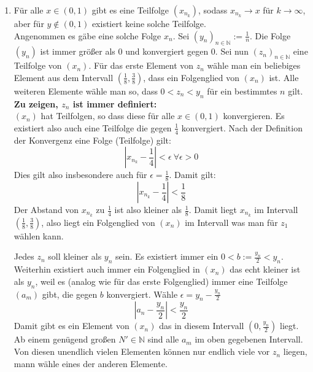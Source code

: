 \documentclass{article}
\begin{document}
\begin{enumerate}[ label = (\roman*)]
            \item Für alle \( x \in (0, 1) \) gibt es eine Teilfolge \( (x_{n_k}) \), sodass \(x_{n_k} \to x\) für \( k \to \infty \), aber für \(y \notin (0, 1)\) existiert keine solche Teilfolge. \\
            Angenommen es gäbe eine solche Folge \(x_n\).
            Sei \( {(y_n)}_{n \in \mathbb{N}} := \frac{1}{n} \). Die Folge \( (y_n) \) ist immer größer als 0 und konvergiert gegen 0.
            Sei nun \( {(z_n)}_{n \in \mathbb{N}} \) eine Teilfolge von \((x_n)\).
            Für das erste Element von \(z_n\) wähle man ein beliebiges Element aus dem Intervall \( (\frac{1}{8}, \frac{3}{8}) \), dass ein Folgenglied von \((x_n)\) ist. 
            Alle weiteren Elemente wähle man so, dass \(0 < z_n < y_n\) für ein bestimmtes \(n\) gilt. \\
            \textbf{Zu zeigen, \(z_n\) ist immer definiert:} \\
            \((x_n)\) hat Teilfolgen, so dass diese für alle \(x \in (0, 1)\) konvergieren. Es existiert also auch eine Teilfolge die gegen \(\frac{1}{4}\) konvergiert.
            Nach der Definition der Konvergenz eine Folge (Teilfolge) gilt:
            \[ | x_{n_k} - \frac{1}{4} | < \epsilon \ \forall \epsilon > 0 \]
            Dies gilt also insbesondere auch für \(\epsilon = \frac{1}{8}\). Damit gilt:
            \[ | x_{n_k} - \frac{1}{4} | < \frac{1}{8} \]
            Der Abstand von \(x_{n_k}\) zu \(\frac{1}{4}\) ist also kleiner als \(\frac{1}{8}\). Damit liegt \(x_{n_k}\) im Intervall \( (\frac{1}{8}, \frac{3}{8}) \),
            also liegt ein Folgenglied von \((x_n)\) im Intervall was man für \(z_1\) wählen kann.

            Jedes \(z_n\) soll kleiner als \(y_n\) sein.
            Es existiert immer ein \( 0 < b:= \frac{y_{n}}{2} < y_{n}\).
            Weiterhin existiert auch immer ein Folgenglied in \((x_n)\) das echt kleiner ist als \(y_{n}\),
            weil es (analog wie für das erste Folgenglied) immer eine Teilfolge \((a_{m})\) gibt, die gegen \(b\) konvergiert.
            Wähle \( \epsilon = y_{n} - \frac{y_{n}}{2} \)
            \[ |a_{n} - \frac{y_{n}}{2} | < \frac{y_{n}}{2} \]
            Damit gibt es ein Element von \((x_n)\) das in diesem Intervall \((0, \frac{y_{n}}{2})\) liegt.
            Ab einem genügend großen \(N' \in \mathbb{N}\) sind alle \(a_m\) im oben gegebenen Intervall.
            Von diesen unendlich vielen Elementen können nur endlich viele vor \(z_n\) liegen, mann wähle eines der anderen Elemente.
            

\end{enumerate}
\end{document}
